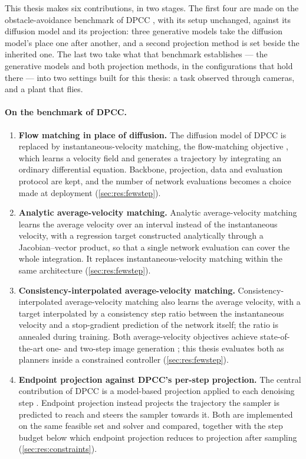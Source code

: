This thesis makes six contributions, in two stages. The first four are made on the obstacle-avoidance
benchmark of \ac{DPCC} \parencite{romer2025diffusion,jia2024towards}, with its setup unchanged, against
its diffusion model and its projection: three generative models take the diffusion model's place one
after another, and a second projection method is set beside the inherited one. The last two take what
that benchmark establishes --- the generative models and both projection methods, in the
configurations that hold there --- into two settings built for this thesis: a task observed through
cameras, and a plant that flies.

\paragraph{On the benchmark of \ac{DPCC}.}
\begin{enumerate}
  \item \textbf{Flow matching in place of diffusion.} The diffusion model of \ac{DPCC}
    \parencite{romer2025diffusion} is replaced by instantaneous-velocity matching, the flow-matching
    objective \parencite{lipman2023flow,lipman2024guide}, which learns a velocity field and generates a
    trajectory by integrating an ordinary differential equation. Backbone, projection, data and
    evaluation protocol are kept, and the number of network evaluations becomes a choice made at
    deployment (\autoref{sec:res:fewstep}).
  \item \textbf{Analytic average-velocity matching.} Analytic average-velocity matching
    \parencite{geng2025meanflow} learns the average velocity over an interval instead of the
    instantaneous velocity, with a regression target constructed analytically through a
    Jacobian--vector product, so that a single network evaluation can cover the whole integration. It
    replaces instantaneous-velocity matching within the same architecture (\autoref{sec:res:fewstep}).
  \item \textbf{Consistency-interpolated average-velocity matching.} Consistency-interpolated
    average-velocity matching \parencite{zhang2025alphaflow} also learns the average velocity, with a
    target interpolated by a consistency step ratio between the instantaneous velocity and a
    stop-gradient prediction of the network itself; the ratio is annealed during training. Both
    average-velocity objectives achieve state-of-the-art one- and two-step image generation
    \parencite{geng2025meanflow,zhang2025alphaflow}; this thesis evaluates both as planners inside a
    constrained controller (\autoref{sec:res:fewstep}).
  \item \textbf{Endpoint projection against DPCC's per-step projection.} The central contribution of
    DPCC is a model-based projection applied to each denoising step \parencite{romer2025diffusion}.
    Endpoint projection \parencite{li2025hardflow} instead projects the trajectory the sampler is
    predicted to reach and steers the sampler towards it. Both are implemented on the same feasible set
    and solver and compared, together with the step budget below which endpoint projection reduces to
    projection after sampling (\autoref{sec:res:constraints}).
\end{enumerate}

